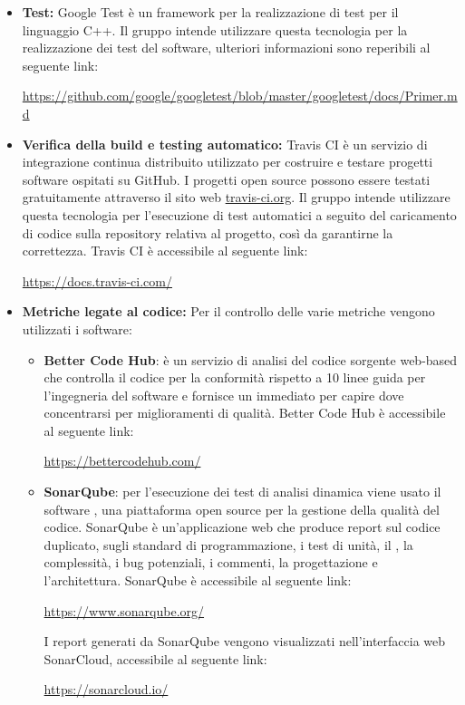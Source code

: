 \documentclass[../NormediProgetto.tex]{subfiles}
\begin{document}
	\begin{itemize}
		\item \textbf{Test:} Google Test è un framework per la realizzazione di test per il linguaggio C++. Il gruppo intende utilizzare questa tecnologia per la realizzazione dei test del software, ulteriori informazioni sono reperibili al seguente link:
		\begin{center}
			\url{https://github.com/google/googletest/blob/master/googletest/docs/Primer.md}
		\end{center}
		\item \textbf{Verifica della build e testing automatico:} Travis CI è un servizio di integrazione continua distribuito utilizzato per costruire e testare progetti software ospitati su GitHub. I progetti open source possono essere testati gratuitamente attraverso il sito web \url{travis-ci.org}. Il gruppo intende utilizzare questa tecnologia per l'esecuzione di test automatici a seguito del caricamento di codice sulla repository relativa al progetto, così da garantirne la correttezza. Travis CI è accessibile al seguente link:
		\begin{center}
			\url{https://docs.travis-ci.com/}
		\end{center}
		
		\item \textbf{Metriche legate al codice:} Per il controllo delle varie metriche vengono utilizzati i software:
		\begin{itemize}
			\item \textbf{Better Code Hub}:  è un servizio di analisi del codice sorgente web-based che controlla il codice per la conformità rispetto a 10 linee guida per l'ingegneria del software e fornisce un  immediato per capire dove concentrarsi per miglioramenti di qualità. Better Code Hub è accessibile al seguente link:
			\begin{center}
				\url{https://bettercodehub.com/}
			\end{center}
		
			
			\item \textbf{SonarQube}: per l’esecuzione dei test di analisi dinamica viene usato il software , una piattaforma open source per la gestione della qualità del codice. SonarQube è un’applicazione web che produce report sul codice duplicato, sugli standard di programmazione, i test di unità, il , la complessità, i bug potenziali, i commenti, la progettazione e l’architettura. SonarQube è accessibile al seguente link:
			\begin{center}
				\url{https://www.sonarqube.org/}
			\end{center}
		
			I report generati da SonarQube vengono visualizzati nell'interfaccia web SonarCloud, accessibile al seguente link:
			\begin{center}
				\url{https://sonarcloud.io/}
			\end{center}
		\end{itemize} 
	\end{itemize}
\end{document}
